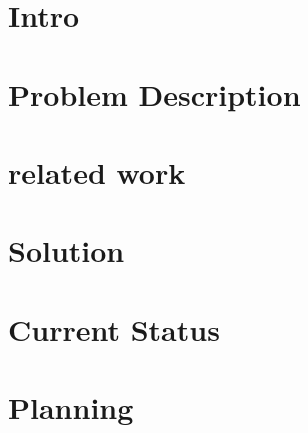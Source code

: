 \begin{frame}
 \titlepage
\end{frame}

\section{Intro} %


\section{Problem Description} %


\section{related work} %


\section{Solution} %


\section{Current Status} %


\section{Planning} %

